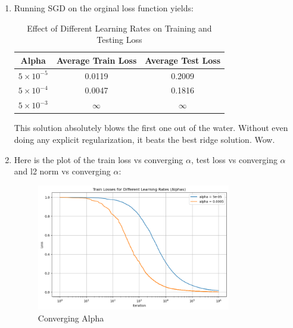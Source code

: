 \documentclass[12pt]{article}
\theoremstyle{definitionstyle}
\begin{document}
\begin{enumerate}[leftmargin=\labelsep]
\begin{enumerate}
            \item Running SGD on the orginal loss function yields:
            \begin{table}[H]
                \centering
                \begin{tabular}{|c|c|c|}
                    \hline
                    \textbf{Alpha} & \textbf{Average Train Loss} & \textbf{Average Test Loss} \\
                    \hline
                    $5 \times 10^{-5}$ & 0.0119 & 0.2009 \\
                    \hline
                    $5 \times 10^{-4}$ & 0.0047 & 0.1816 \\
                    \hline
                    $5 \times 10^{-3}$ & $\infty$ & $\infty$ \\
                    \hline
                \end{tabular}
                \caption{Effect of Different Learning Rates on Training and Testing Loss}
                \label{tab:learning_rates}
            \end{table}
            This solution absolutely blows the first one out of the water. Without even doing any explicit regularization, it beats the best ridge solution. Wow. 

            \item Here is the plot of the train loss vs converging $\alpha$, test loss vs converging $\alpha$ and l2 norm vs converging $\alpha$:
            \begin{figure}[H]
                \centering
                \includegraphics[width=0.8\textwidth]{train_wrt_alpha.png}
                \caption{Converging Alpha}
                \label{fig:converging_alpha}
            \end{figure}


\end{enumerate}
\end{enumerate}
\end{document}
